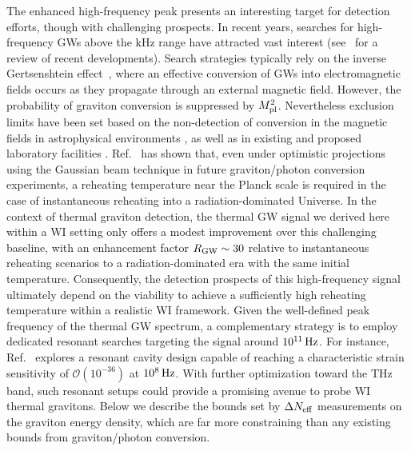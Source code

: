 The enhanced high-frequency peak presents an interesting target for detection efforts, though with challenging prospects. In recent years, searches for high-frequency GWs above the kHz range have attracted vast interest (see~\cite{Aggarwal:2025noe} for a review of recent developments).   Search strategies typically rely on the inverse Gertsenshtein effect~\cite{gertsenshtein1962wave}, where an effective conversion of GWs into electromagnetic fields occurs as they propagate through an external magnetic field. However, the probability of graviton conversion is suppressed by $M^2_{\rm pl}$. Nevertheless exclusion limits have been set based on the non-detection of conversion in the magnetic fields in astrophysical environments \cite{Domcke:2020yzq, Liu:2023mll, Ito:2023fcr, Ito:2023nkq, He:2023xoh, Dandoy:2024oqg, Lella:2024dus, McDonald:2024nxj, Dunsky:2025pvd, Matsuo:2025blj}, as well as in existing and proposed laboratory facilities \cite{Ejlli:2019bqj, Domcke:2022rgu, Gao:2023gph, Domcke:2023bat, Valero:2024ncz, Domcke:2024mfu, Domcke:2024eti, Capdevilla:2024cby, Pappas:2025zld}.  Ref.~\cite{Ringwald:2020ist} has shown that, even under optimistic projections using the Gaussian beam technique in future graviton/photon conversion experiments, a reheating temperature near the Planck scale is required in the case of instantaneous reheating into a radiation-dominated Universe.  In the context of thermal graviton detection,  the thermal GW signal we derived here within a WI setting only offers a modest improvement over this challenging baseline, with an enhancement factor $R_{\rm GW}\sim 30$ relative to instantaneous reheating scenarios to a radiation-dominated era with the same initial temperature. Consequently, the detection prospects of this high-frequency signal ultimately depend on the viability to achieve a sufficiently high reheating temperature within a realistic WI framework. Given the well-defined peak frequency of the thermal GW spectrum, a complementary strategy is to employ dedicated resonant searches targeting the signal around $10^{11}\,{\rm Hz}$. For instance, Ref.~\cite{Herman:2022fau} explores a resonant cavity design capable of reaching a characteristic strain sensitivity of $\mathcal{O}(10^{-36})$ at $10^{8}\,{\rm Hz}$. With further optimization toward the THz band, such resonant setups could provide a promising avenue to probe WI thermal gravitons. Below we describe the bounds set by $\Delta N_{\rm eff}$ measurements on the graviton energy density, which are far more constraining than any existing bounds from graviton/photon conversion.

